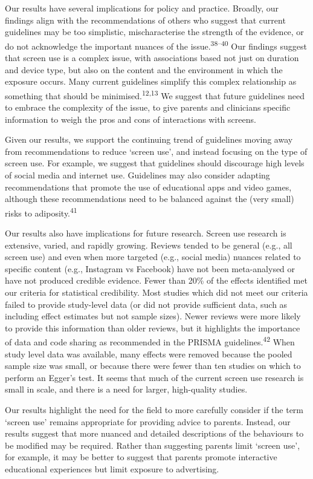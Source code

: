 \documentclass[
  english,
  man]{apa6}
\begin{document}
Our results have several implications for policy and practice.
Broadly, our findings align with the recommendations of others who suggest that current guidelines may be too simplistic, mischaracterise the strength of the evidence, or do not acknowledge the important nuances of the issue.\textsuperscript{38--40}
Our findings suggest that screen use is a complex issue, with associations based not just on duration and device type, but also on the content and the environment in which the exposure occurs.
Many current guidelines simplify this complex relationship as something that should be minimised.\textsuperscript{12,13}
We suggest that future guidelines need to embrace the complexity of the issue, to give parents and clinicians specific information to weigh the pros and cons of interactions with screens.

Given our results, we support the continuing trend of guidelines moving away from recommendations to reduce `screen use', and instead focusing on the type of screen use.
For example, we suggest that guidelines should discourage high levels of social media and internet use.
Guidelines may also consider adapting recommendations that promote the use of educational apps and video games, although these recommendations need to be balanced against the (very small) risks to adiposity.\textsuperscript{41}

Our results also have implications for future research.
Screen use research is extensive, varied, and rapidly growing.
Reviews tended to be general (e.g., all screen use) and even when more targeted (e.g., social media) nuances related to specific content (e.g., Instagram vs Facebook) have not been meta-analysed or have not produced credible evidence.
Fewer than 20\% of the effects identified met our criteria for statistical credibility.
Most studies which did not meet our criteria failed to provide study-level data (or did not provide sufficient data, such as including effect estimates but not sample sizes).
Newer reviews were more likely to provide this information than older reviews, but it highlights the importance of data and code sharing as recommended in the PRISMA guidelines.\textsuperscript{42}
When study level data was available, many effects were removed because the pooled sample size was small, or because there were fewer than ten studies on which to perform an Egger's test.
It seems that much of the current screen use research is small in scale, and there is a need for larger, high-quality studies.

Our results highlight the need for the field to more carefully consider if the term `screen use' remains appropriate for providing advice to parents.
Instead, our results suggest that more nuanced and detailed descriptions of the behaviours to be modified may be required.
Rather than suggesting parents limit `screen use', for example, it may be better to suggest that parents promote interactive educational experiences but limit exposure to advertising.
\end{document}
